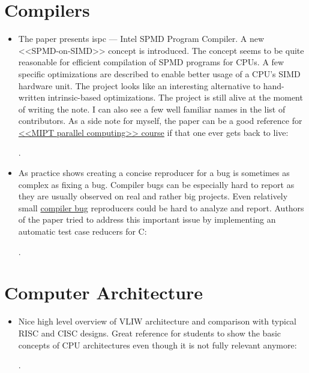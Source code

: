 \section*{Compilers}
\begin{itemize}
    \item The paper presents ispc --- Intel SPMD Program Compiler. A new <<SPMD-on-SIMD>> concept is introduced. The concept seems to be quite reasonable for efficient compilation of SPMD programs for CPUs. A few specific optimizations are described to enable better usage of a CPU's SIMD hardware unit. The project looks like an interesting alternative to hand-written intrinsic-based optimizations. The project is still alive at the moment of writing the note. I can also see a few well familiar names in the list of contributors. As a side note for myself, the paper can be a good reference for \href{https://github.com/yulyugin/mipt-parallel-computing}{<<MIPT parallel computing>> course} if that one ever gets back to live:

    \cite{Pharr:ispc:2012}.

    \item As practice shows creating a concise reproducer for a bug is sometimes as complex as fixing a bug. Compiler bugs can be especially hard to report as they are usually observed on real and rather big projects. Even relatively small \href{https://yulyugin.github.io/blog/2022/icc-bug}{compiler bug} reproducers could be hard to analyze and report. Authors of the paper tried to address this important issue by implementing an automatic test case reducers for C:

    \cite{Regehr:C-Reduce:2012}.
\end{itemize}

\section*{Computer Architecture}
\begin{itemize}
    \item Nice high level overview of VLIW architecture and comparison with typical RISC and CISC designs. Great reference for students to show the basic concepts of CPU architectures even though it is not fully relevant anymore:

    \cite{Philips:VLIW:1997}.
\end{itemize}


